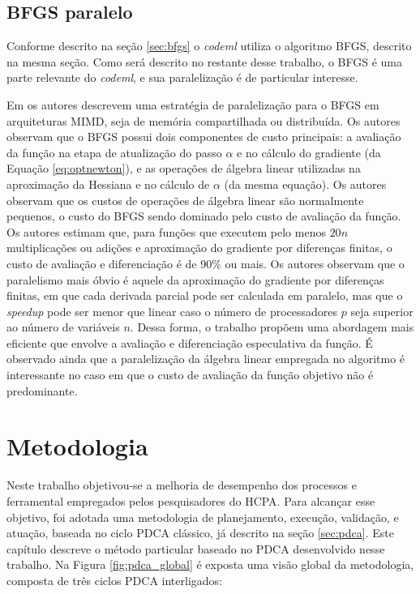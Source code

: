 \documentclass[cic,tc]{iiufrgs}
\begin{document}
\section{BFGS paralelo}
\label{sec:parbfgs}

Conforme descrito na seção \ref{sec:bfgs} o \textit{codeml} utiliza o algoritmo BFGS,
descrito na mesma seção. Como será descrito no restante desse trabalho, o BFGS
é uma parte relevante do \textit{codeml}, e sua paralelização é de particular interesse.

Em \cite{byrd1988parallel} os autores descrevem uma estratégia de paralelização
para o BFGS em arquiteturas MIMD, seja de memória compartilhada ou distribuída.
Os autores observam que o BFGS possui dois componentes de custo principais: a
avaliação da função na etapa de atualização do passo $\alpha$ e no cálculo do
gradiente (da Equação \ref{eq:optnewton}), e as operações de álgebra linear
utilizadas na aproximação da Hessiana e no cálculo de $\alpha$ (da mesma
equação). Os autores observam que os custos de operações de álgebra linear são
normalmente pequenos, o custo do BFGS sendo dominado pelo custo de avaliação da
função. Os autores estimam que, para funções que executem pelo menos $20n$
multiplicações ou adições e aproximação do gradiente por diferenças finitas, o
custo de avaliação e diferenciação é de 90\% ou mais. Os autores observam que o
paralelismo mais óbvio é aquele da aproximação do gradiente por diferenças
finitas, em que cada derivada parcial pode ser calculada em paralelo, mas que o
\textit{speedup} pode ser menor que linear caso o número de processadores $p$
seja superior ao número de variáveis $n$. Dessa forma, o trabalho propõem uma
abordagem mais eficiente que envolve a avaliação e diferenciação especulativa
da função. É observado ainda que a paralelização da álgebra linear empregada no
algoritmo é interessante no caso em que o custo de avaliação da função objetivo
não é predominante.

%
%
%
%

\chapter{Metodologia}
\label{chap:mod}

Neste trabalho objetivou-se a melhoria de desempenho dos processos e
ferramental empregados pelos pesquisadores do HCPA. Para alcançar esse
objetivo, foi adotada uma metodologia de planejamento, execução, validação, e
atuação, baseada no ciclo PDCA clássico, já descrito na seção \ref{sec:pdca}.
Este capítulo descreve o método particular baseado no PDCA desenvolvido nesse
trabalho. Na Figura \ref{fig:pdca_global} é exposta uma visão global da
metodologia, composta de três ciclos PDCA interligados:
\end{document}
